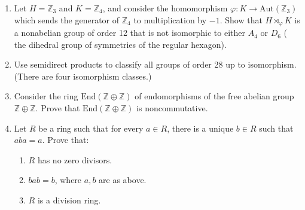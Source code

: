\documentclass[12pt]{article}
\newcommand{\ZZ}{{\mathbb Z}}
\newcommand{\Aut}{\mbox{Aut}}
\newcommand{\End}{\mbox{End}}
\begin{document}
\begin{enumerate}
\item      Let $H=\ZZ_3$ and $K=\ZZ_4$, and consider the homomorphism
       $\varphi\colon K\to \Aut(\ZZ_3)$ which sends the generator of
       $\ZZ_4$ to multiplication by $-1$.
      Show that $H\rtimes_\varphi K$ is a nonabelian group of order 12 that is not isomorphic
      to either $A_4$ or $D_{6}$ ( the dihedral group of symmetries of the regular hexagon).
\vspace{-2pt}
 
\item     Use semidirect products to classify all groups of order 28 up to isomorphism.
      (There are four isomorphism classes.)
\vspace{-2pt}

\item
  Consider the ring $\End(\ZZ\oplus\ZZ)$ of endomorphisms of the free abelian group $\ZZ\oplus\ZZ$.
  Prove that $\End(\ZZ\oplus\ZZ)$ is noncommutative.
\vspace{-2pt}
  
 
\item
  Let $R$ be a ring such that for every $a\in R$, there is a unique $b\in R$ such that $aba=a$.
  Prove that:
\vspace{-2pt}
  \begin{enumerate}
  \item $R$ has no zero divisors.
  \item $bab=b$, where $a,b$ are as above.
  \item $R$ is a division ring.
\vspace{-2pt}
  \end{enumerate}
  

\end{enumerate}
\end{document}
